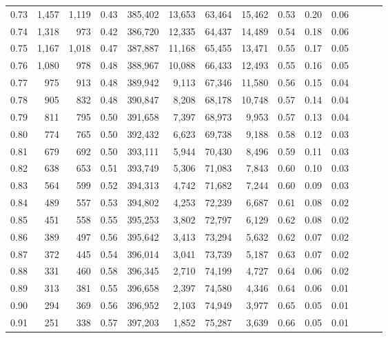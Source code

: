 \begin{tabular}{rrrrrrrrrrrrrr}
0.73 &  1,457 &  1,119 &  0.43 &  385,402 &   13,653 &  63,464 &  15,462 &  0.53 &  0.20 &      0.06 \\
0.74 &  1,318 &    973 &  0.42 &  386,720 &   12,335 &  64,437 &  14,489 &  0.54 &  0.18 &      0.06 \\
0.75 &  1,167 &  1,018 &  0.47 &  387,887 &   11,168 &  65,455 &  13,471 &  0.55 &  0.17 &      0.05 \\
0.76 &  1,080 &    978 &  0.48 &  388,967 &   10,088 &  66,433 &  12,493 &  0.55 &  0.16 &      0.05 \\
0.77 &    975 &    913 &  0.48 &  389,942 &    9,113 &  67,346 &  11,580 &  0.56 &  0.15 &      0.04 \\
0.78 &    905 &    832 &  0.48 &  390,847 &    8,208 &  68,178 &  10,748 &  0.57 &  0.14 &      0.04 \\
0.79 &    811 &    795 &  0.50 &  391,658 &    7,397 &  68,973 &   9,953 &  0.57 &  0.13 &      0.04 \\
0.80 &    774 &    765 &  0.50 &  392,432 &    6,623 &  69,738 &   9,188 &  0.58 &  0.12 &      0.03 \\
0.81 &    679 &    692 &  0.50 &  393,111 &    5,944 &  70,430 &   8,496 &  0.59 &  0.11 &      0.03 \\
0.82 &    638 &    653 &  0.51 &  393,749 &    5,306 &  71,083 &   7,843 &  0.60 &  0.10 &      0.03 \\
0.83 &    564 &    599 &  0.52 &  394,313 &    4,742 &  71,682 &   7,244 &  0.60 &  0.09 &      0.03 \\
0.84 &    489 &    557 &  0.53 &  394,802 &    4,253 &  72,239 &   6,687 &  0.61 &  0.08 &      0.02 \\
0.85 &    451 &    558 &  0.55 &  395,253 &    3,802 &  72,797 &   6,129 &  0.62 &  0.08 &      0.02 \\
0.86 &    389 &    497 &  0.56 &  395,642 &    3,413 &  73,294 &   5,632 &  0.62 &  0.07 &      0.02 \\
0.87 &    372 &    445 &  0.54 &  396,014 &    3,041 &  73,739 &   5,187 &  0.63 &  0.07 &      0.02 \\
0.88 &    331 &    460 &  0.58 &  396,345 &    2,710 &  74,199 &   4,727 &  0.64 &  0.06 &      0.02 \\
0.89 &    313 &    381 &  0.55 &  396,658 &    2,397 &  74,580 &   4,346 &  0.64 &  0.06 &      0.01 \\
0.90 &    294 &    369 &  0.56 &  396,952 &    2,103 &  74,949 &   3,977 &  0.65 &  0.05 &      0.01 \\
0.91 &    251 &    338 &  0.57 &  397,203 &    1,852 &  75,287 &   3,639 &  0.66 &  0.05 &      0.01 \\

\end{tabular}
